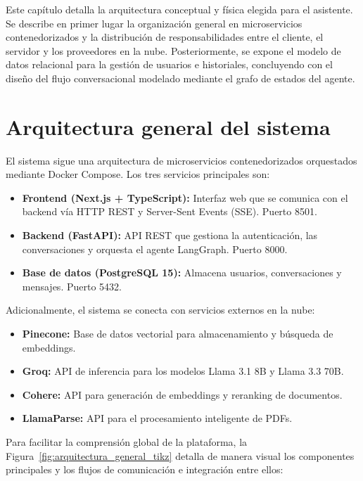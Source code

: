 \documentclass[12pt,a4paper,oneside]{report}
\begin{document}
Este capítulo detalla la arquitectura conceptual y física elegida para el asistente. Se describe en primer lugar la organización general en microservicios contenedorizados y la distribución de responsabilidades entre el cliente, el servidor y los proveedores en la nube. Posteriormente, se expone el modelo de datos relacional para la gestión de usuarios e historiales, concluyendo con el diseño del flujo conversacional modelado mediante el grafo de estados del agente.

\section{Arquitectura general del sistema}

El sistema sigue una arquitectura de microservicios contenedorizados orquestados mediante Docker Compose. Los tres servicios principales son:

\begin{itemize}
    \item \textbf{Frontend (Next.js + TypeScript):} Interfaz web que se comunica con el backend vía HTTP REST y Server-Sent Events (SSE). Puerto 8501.
    \item \textbf{Backend (FastAPI):} API REST que gestiona la autenticación, las conversaciones y orquesta el agente LangGraph. Puerto 8000.
    \item \textbf{Base de datos (PostgreSQL 15):} Almacena usuarios, conversaciones y mensajes. Puerto 5432.
\end{itemize}

Adicionalmente, el sistema se conecta con servicios externos en la nube:
\begin{itemize}
    \item \textbf{Pinecone:} Base de datos vectorial para almacenamiento y búsqueda de embeddings.
    \item \textbf{Groq:} API de inferencia para los modelos Llama 3.1 8B y Llama 3.3 70B.
    \item \textbf{Cohere:} API para generación de embeddings y reranking de documentos.
    \item \textbf{LlamaParse:} API para el procesamiento inteligente de PDFs.
\end{itemize}

Para facilitar la comprensión global de la plataforma, la Figura~\ref{fig:arquitectura_general_tikz} detalla de manera visual los componentes principales y los flujos de comunicación e integración entre ellos:
\end{document}
